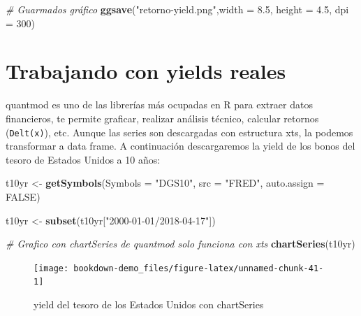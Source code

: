 \documentclass[12pt,]{book}
\newenvironment{Shaded}{\begin{snugshade}}{\end{snugshade}}
\newcommand{\KeywordTok}[1]{\textcolor[rgb]{0.13,0.29,0.53}{\textbf{#1}}}
\newcommand{\DataTypeTok}[1]{\textcolor[rgb]{0.13,0.29,0.53}{#1}}
\newcommand{\DecValTok}[1]{\textcolor[rgb]{0.00,0.00,0.81}{#1}}
\newcommand{\FloatTok}[1]{\textcolor[rgb]{0.00,0.00,0.81}{#1}}
\newcommand{\StringTok}[1]{\textcolor[rgb]{0.31,0.60,0.02}{#1}}
\newcommand{\CommentTok}[1]{\textcolor[rgb]{0.56,0.35,0.01}{\textit{#1}}}
\newcommand{\OtherTok}[1]{\textcolor[rgb]{0.56,0.35,0.01}{#1}}
\newcommand{\NormalTok}[1]{#1}
\begin{document}
\begin{Shaded}
\begin{Highlighting}[]
\CommentTok{# Guarmados gráfico}
\KeywordTok{ggsave}\NormalTok{(}\StringTok{"retorno-yield.png"}\NormalTok{,}\DataTypeTok{width =} \FloatTok{8.5}\NormalTok{, }\DataTypeTok{height =} \FloatTok{4.5}\NormalTok{, }\DataTypeTok{dpi =} \DecValTok{300}\NormalTok{)}
\end{Highlighting}
\end{Shaded}

\section{Trabajando con yields
reales}\label{trabajando-con-yields-reales}

quantmod es uno de las librerías más ocupadas en R para extraer datos
financieros, te permite graficar, realizar análisis técnico, calcular
retornos (\texttt{Delt(x)}), etc. Aunque las series son descargadas con
estructura xts, la podemos transformar a data frame. A continuación
descargaremos la yield de los bonos del tesoro de Estados Unidos a 10
años:

\begin{Shaded}
\begin{Highlighting}[]
\NormalTok{t10yr <-}\StringTok{ }\KeywordTok{getSymbols}\NormalTok{(}\DataTypeTok{Symbols =} \StringTok{"DGS10"}\NormalTok{, }\DataTypeTok{src =} \StringTok{"FRED"}\NormalTok{, }\DataTypeTok{auto.assign =} \OtherTok{FALSE}\NormalTok{)}

\NormalTok{t10yr <-}\StringTok{ }\KeywordTok{subset}\NormalTok{(t10yr[}\StringTok{"2000-01-01/2018-04-17"}\NormalTok{])}
\end{Highlighting}
\end{Shaded}

\begin{Shaded}
\begin{Highlighting}[]
\CommentTok{# Grafico con chartSeries de quantmod solo funciona con xts}
\KeywordTok{chartSeries}\NormalTok{(t10yr)}
\end{Highlighting}
\end{Shaded}

\begin{figure}

{\centering \texttt{[image: bookdown-demo\_files/figure-latex/unnamed-chunk-41-1]} 

}

\caption{yield del tesoro de los Estados Unidos con chartSeries}\label{fig:unnamed-chunk-41}
\end{figure}
\end{document}
